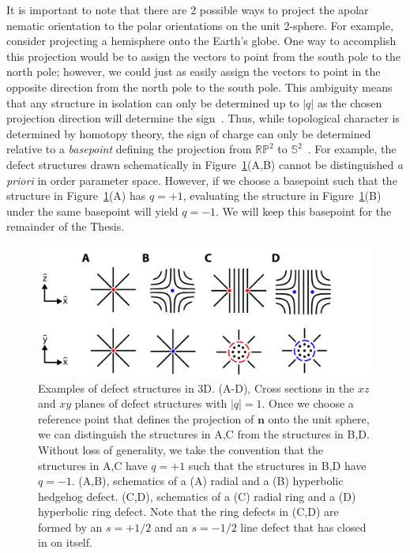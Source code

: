 It is important to note that there are 2 possible ways to project the apolar nematic orientation to the polar orientations on the unit 2-sphere.
For example, consider projecting a hemisphere onto the Earth's globe.
One way to accomplish this projection would be to assign the vectors to point from the south pole to the north pole; however, we could just as easily assign the vectors to point in the opposite direction from the north pole to the south pole.
This ambiguity means that any structure in isolation can only be determined up to $|q|$ as the chosen projection direction will determine the sign~\cite{RN153}.
Thus, while topological character is determined by homotopy theory, the sign of charge can only be determined relative to a \emph{basepoint} defining the projection from $\mathbb{R}\mathbb{P}^2$ to $\mathbb{S}^2$~\cite{RN153}.
For example, the defect structures drawn schematically in Figure~\ref{f:2-3DMeas}(A,B) cannot be distinguished \emph{a priori} in order parameter space.
However, if we choose a basepoint such that the structure in Figure~\ref{f:2-3DMeas}(A) has $q = +1$, evaluating the structure in Figure~\ref{f:2-3DMeas}(B) under the same basepoint will yield $q = -1$.
We will keep this basepoint for the remainder of the Thesis.
\begin{figure}[h]
  \centering
  \includegraphics{figures/C2/Ch2-Figs_3DMeas.png}
  \caption{Examples of defect structures in 3D.
  (A-D), Cross sections in the $xz$ and $xy$ planes of defect structures with $|q| = 1$.
  Once we choose a reference point that defines the projection of $\mathbf{n}$ onto the unit sphere, we can distinguish the structures in A,C from the structures in B,D.
  Without loss of generality, we take the convention that the structures in A,C have $q = +1$ such that the structures in B,D have $q = -1$.
  (A,B), schematics of a (A) radial and a (B) hyperbolic hedgehog defect.
  (C,D), schematics of a (C) radial ring and a (D) hyperbolic ring defect.
  Note that the ring defects in (C,D) are formed by an $s = +1/2 $ and an $s = -1/2$ line defect that has closed in on itself.}\label{f:2-3DMeas}
\end{figure}

